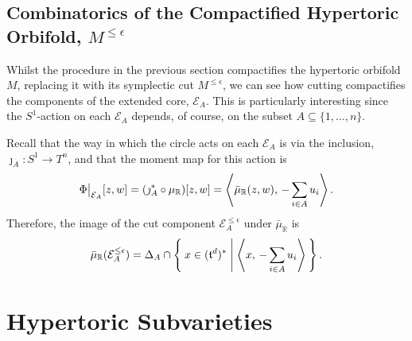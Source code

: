\documentclass{amsart}
\newcommand{\ra}{\rightarrow}
\newcommand{\e}{\epsilon}
\newcommand{\RR}{\mathbb{R}}
\newcommand{\mcE}{\mathcal{E}}
\newcommand{\mft}{\mathfrak{t}}
\newcommand\restr[2]{{%
		\left.\kern-\nulldelimiterspace %
		#1 %
		\vphantom{\big|} %
		\right|_{#2} %
}}
\begin{document}
	\subsection{Combinatorics of the Compactified Hypertoric Orbifold, $M^{\leq \e}$}
	
	Whilst the procedure in the previous section compactifies the hypertoric orbifold $M$, replacing it with its symplectic cut $M^{\leq \e}$, we can see how cutting compactifies the components of the extended core, $\mcE_{A}$. This is particularly interesting since the $S^{1}$-action on each $\mcE_{A}$ depends, of course, on the subset $A \subseteq \{1, \ldots, n\}$.
	
	Recall that the way in which the circle acts on each $\mcE_{A}$ is via the inclusion, $\jmath_{A}: S^{1} \ra T^{n}$, and that the moment map for this action is
	\[
		\restr{\Phi}{\mcE_{A}}[z,w] = (\jmath_{A}^{\ast} \circ \mu_{\RR})[z,w] = \left\langle \bar{\mu}_{\RR}(z,w), \, -\sum_{i \in A} u_{i} \right\rangle.
	\]
	Therefore, the image of the cut component $\mcE_{A}^{\leq \e}$ under $\bar{\mu}_{\RR}$ is
	\[
		\bar{\mu}_{\RR}(\mcE_{A}^{\leq \e}) = \Delta_{A} \cap \Set{x \in (\mft^{d})^{\ast } | \left\langle x,\, -\sum_{i \in A}u_{i} \right\rangle }.
	\]
	
	\section{Hypertoric Subvarieties}
	
	
	  
	
	
\end{document}
